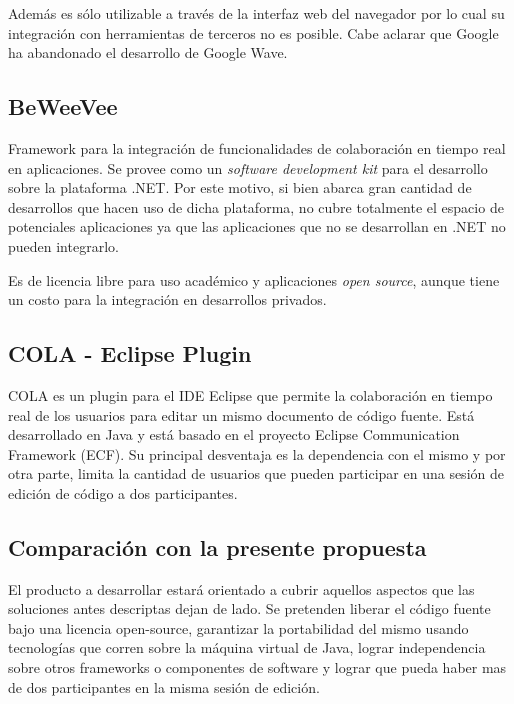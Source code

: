 \documentclass[12pt,a4paper]{article}
\begin{document}
Además es sólo utilizable a través de la interfaz web del navegador por lo cual su integración con
herramientas de terceros no es posible. Cabe aclarar que Google ha abandonado el desarrollo de Google Wave.

	\subsection{BeWeeVee \cite{beweevee}}

Framework para la integración de funcionalidades de colaboración en tiempo real en aplicaciones.
Se provee como un \textit{software development kit} para el desarrollo sobre la plataforma .NET.
Por este motivo, si bien abarca gran cantidad de desarrollos que hacen uso de dicha plataforma, no
cubre totalmente el espacio de potenciales aplicaciones ya que las aplicaciones que no se desarrollan en
.NET no pueden integrarlo.

Es de licencia libre para uso académico y aplicaciones \textit{open source}, aunque tiene un costo para
la integración en desarrollos privados.

	\subsection{COLA \cite{cola} - Eclipse Plugin}

COLA es un plugin para el IDE Eclipse que permite la colaboración en tiempo real de los usuarios para editar
un mismo documento de código fuente. Está desarrollado en Java y está basado en el proyecto Eclipse Communication
Framework (ECF). Su principal desventaja es la dependencia con el mismo y por otra parte, limita la cantidad
de usuarios que pueden participar en una sesión de edición de código a dos participantes.

	\subsection{Comparación con la presente propuesta}
El producto a desarrollar estará orientado a cubrir aquellos aspectos que las soluciones antes descriptas
dejan de lado. Se pretenden liberar el código fuente bajo una licencia open-source, garantizar la portabilidad del
mismo usando tecnologías que corren sobre la máquina virtual de Java, lograr independencia sobre otros frameworks
o componentes de software y lograr que pueda haber mas de dos participantes en la misma sesión de edición.
\end{document}
